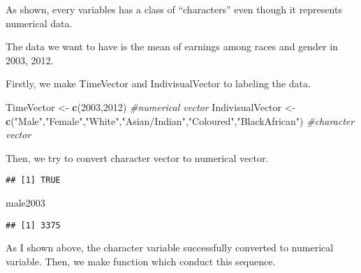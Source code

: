 \documentclass[]{article}
\newenvironment{Shaded}{\begin{snugshade}}{\end{snugshade}}
\newcommand{\KeywordTok}[1]{\textcolor[rgb]{0.13,0.29,0.53}{\textbf{{#1}}}}
\newcommand{\DecValTok}[1]{\textcolor[rgb]{0.00,0.00,0.81}{{#1}}}
\newcommand{\CharTok}[1]{\textcolor[rgb]{0.31,0.60,0.02}{{#1}}}
\newcommand{\StringTok}[1]{\textcolor[rgb]{0.31,0.60,0.02}{{#1}}}
\newcommand{\CommentTok}[1]{\textcolor[rgb]{0.56,0.35,0.01}{\textit{{#1}}}}
\newcommand{\NormalTok}[1]{{#1}}
\begin{document}
As shown, every variables has a class of ``characters'' even though it
represents numerical data.

The data we want to have is the mean of earnings among races and gender
in 2003, 2012.

Firstly, we make TimeVector and IndivisualVector to labeling the data.

\begin{Shaded}
\begin{Highlighting}[]
\NormalTok{TimeVector <-}\StringTok{ }\KeywordTok{c}\NormalTok{(}\DecValTok{2003}\NormalTok{,}\DecValTok{2012}\NormalTok{) }\CommentTok{#numerical vector}
\NormalTok{IndivisualVector <-}\StringTok{ }\KeywordTok{c}\NormalTok{(}\StringTok{"Male"}\NormalTok{,}\StringTok{"Female"}\NormalTok{,}\StringTok{"White"}\NormalTok{,}\StringTok{"Asian/Indian"}\NormalTok{,}\StringTok{"Coloured"}\NormalTok{,}\StringTok{"BlackAfrican"}\NormalTok{) }\CommentTok{#character vector}
\end{Highlighting}
\end{Shaded}

Then, we try to convert character vector to numerical vector.

\begin{Shaded}
\end{Shaded}

\begin{verbatim}
## [1] TRUE
\end{verbatim}

\begin{Shaded}
\begin{Highlighting}[]
\NormalTok{male2003}
\end{Highlighting}
\end{Shaded}

\begin{verbatim}
## [1] 3375
\end{verbatim}

As I shown above, the character variable successfully converted to
numerical variable. Then, we make function which conduct this sequence.
\end{document}
